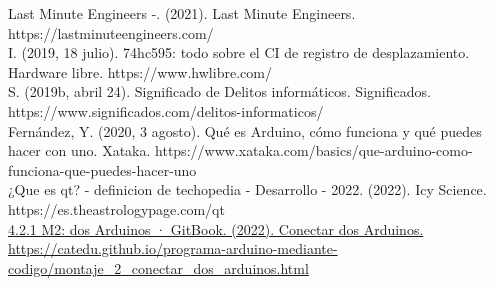 \documentclass{article}
\begin{document}
\justify
Last Minute Engineers -. (2021). Last Minute Engineers. https://lastminuteengineers.com/\\
\newline
I. (2019, 18 julio). 74hc595: todo sobre el CI de registro de desplazamiento. Hardware libre. https://www.hwlibre.com/\\
\newline
S. (2019b, abril 24). Significado de Delitos informáticos. Significados. https://www.significados.com/delitos-informaticos/\\
\newline
Fernández, Y. (2020, 3 agosto). Qué es Arduino, cómo funciona y qué puedes hacer con uno. Xataka. https://www.xataka.com/basics/que-arduino-como-funciona-que-puedes-hacer-uno\\
\newline
¿Que es qt? - definicion de techopedia - Desarrollo - 2022. (2022). Icy Science. https://es.theastrologypage.com/qt\\

\url{4.2.1 M2: dos Arduinos · GitBook. (2022). Conectar dos Arduinos. https://catedu.github.io/programa-arduino-mediante-codigo/montaje_2_conectar_dos_arduinos.html}
\end{document}
